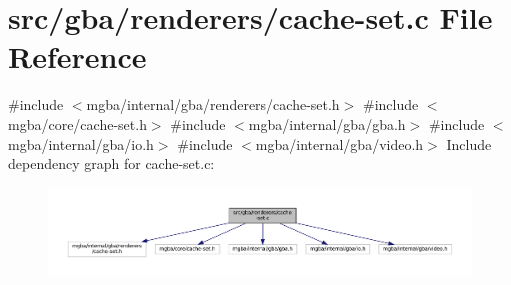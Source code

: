 \hypertarget{gba_2renderers_2cache-set_8c}{}\section{src/gba/renderers/cache-\/set.c File Reference}
\label{gba_2renderers_2cache-set_8c}
{\ttfamily \#include $<$mgba/internal/gba/renderers/cache-\/set.\+h$>$}\newline
{\ttfamily \#include $<$mgba/core/cache-\/set.\+h$>$}\newline
{\ttfamily \#include $<$mgba/internal/gba/gba.\+h$>$}\newline
{\ttfamily \#include $<$mgba/internal/gba/io.\+h$>$}\newline
{\ttfamily \#include $<$mgba/internal/gba/video.\+h$>$}\newline
Include dependency graph for cache-\/set.c\+:
\nopagebreak
\begin{figure}[H]
\begin{center}
\leavevmode
\includegraphics[width=350pt]{gba_2renderers_2cache-set_8c__incl}
\end{center}
\end{figure}
